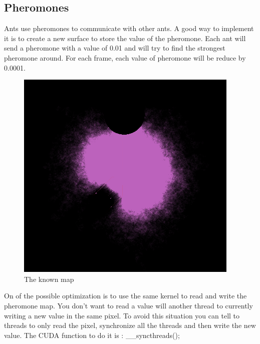 \documentclass{article}
\begin{document}
\subsection{Pheromones}
Ants use pheromones to communicate with other ants. A good way to implement it is to create a new surface to store the value of the pheromone. Each ant will send a pheromone with a value of 0.01 and will try to find the strongest pheromone around. For each frame, each value of pheromone will be reduce by 0.0001.
\begin{figure}[H]
	\centering
	\includegraphics[scale=0.9]{figures/know.png}
	\caption{The known map}
\end{figure}
On of the possible optimization is to use the same kernel to read and write the pheromone map. You don't want to read a value will another thread to currently writing a new value in the same pixel. To avoid this situation you can tell to threads to only read the pixel, synchronize all the threads and then write the new value. The CUDA function to do it is : \_\_syncthreads();
\end{document}
